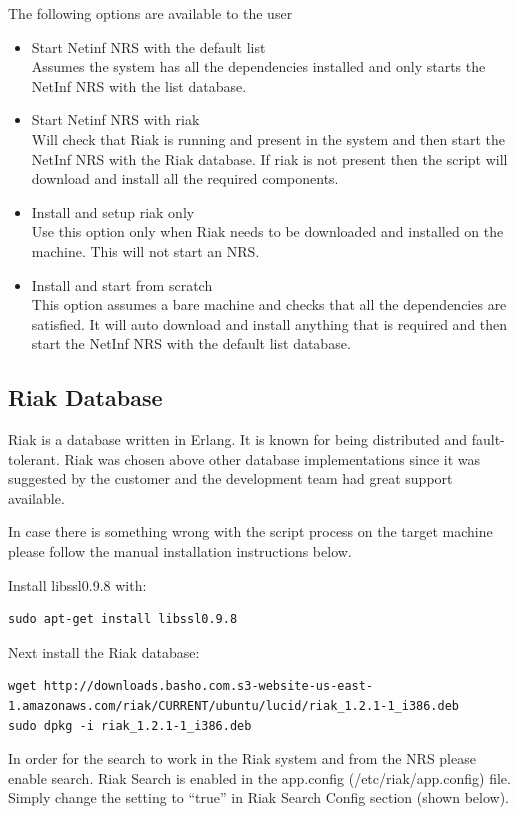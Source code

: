 The following options are available to the user

\begin{itemize}
\item Start Netinf NRS with the default list\\
Assumes the system has all the dependencies installed and only starts the NetInf NRS with the list database.
\item Start Netinf NRS with riak\\
Will check that Riak is running and present in the system and then start the NetInf NRS with the Riak database.
If riak is not present then the script will download and install all the required components. 
\item Install and setup riak only\\
Use this option only when Riak needs to be downloaded and installed on the machine. This will not start an NRS.
\item Install and start from scratch\\
This option assumes a bare machine and checks that all the dependencies are satisfied. It will auto download and install anything that is required and then start the NetInf NRS with the default list database. 
\end{itemize}


\subsection{Riak Database}

Riak is a database written in Erlang. It is known for being distributed and fault-tolerant. Riak was chosen above other database implementations since it was suggested by the customer and the development team had great support available. 

In case there is something wrong with the script process on the target machine please follow the manual installation instructions below.

Install libssl0.9.8 with:
\begin {verbatim}
sudo apt-get install libssl0.9.8
\end{verbatim}

Next install the Riak database:
\begin{verbatim}
wget http://downloads.basho.com.s3-website-us-east-1.amazonaws.com/riak/CURRENT/ubuntu/lucid/riak_1.2.1-1_i386.deb
sudo dpkg -i riak_1.2.1-1_i386.deb
\end{verbatim}

In order for the search to work in the Riak system and from the NRS please enable search.
Riak Search is enabled in the app.config (/etc/riak/app.config) file. Simply change the setting to “true” in Riak Search Config section (shown below).

